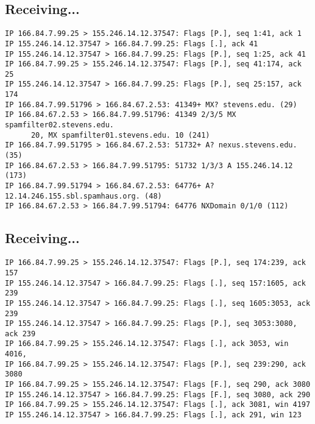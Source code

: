 \documentclass[xga]{xdvislides}
\begin{document}
\subsection{Receiving...}
\begin{verbatim}
IP 166.84.7.99.25 > 155.246.14.12.37547: Flags [P.], seq 1:41, ack 1
IP 155.246.14.12.37547 > 166.84.7.99.25: Flags [.], ack 41
IP 155.246.14.12.37547 > 166.84.7.99.25: Flags [P.], seq 1:25, ack 41
IP 166.84.7.99.25 > 155.246.14.12.37547: Flags [P.], seq 41:174, ack 25
IP 155.246.14.12.37547 > 166.84.7.99.25: Flags [P.], seq 25:157, ack 174
IP 166.84.7.99.51796 > 166.84.67.2.53: 41349+ MX? stevens.edu. (29)
IP 166.84.67.2.53 > 166.84.7.99.51796: 41349 2/3/5 MX spamfilter02.stevens.edu.
      20, MX spamfilter01.stevens.edu. 10 (241)
IP 166.84.7.99.51795 > 166.84.67.2.53: 51732+ A? nexus.stevens.edu. (35)
IP 166.84.67.2.53 > 166.84.7.99.51795: 51732 1/3/3 A 155.246.14.12 (173)
IP 166.84.7.99.51794 > 166.84.67.2.53: 64776+ A? 12.14.246.155.sbl.spamhaus.org. (48)
IP 166.84.67.2.53 > 166.84.7.99.51794: 64776 NXDomain 0/1/0 (112)
\end{verbatim}


\subsection{Receiving...}
\begin{verbatim}
IP 166.84.7.99.25 > 155.246.14.12.37547: Flags [P.], seq 174:239, ack 157
IP 155.246.14.12.37547 > 166.84.7.99.25: Flags [.], seq 157:1605, ack 239
IP 155.246.14.12.37547 > 166.84.7.99.25: Flags [.], seq 1605:3053, ack 239
IP 155.246.14.12.37547 > 166.84.7.99.25: Flags [P.], seq 3053:3080, ack 239
IP 166.84.7.99.25 > 155.246.14.12.37547: Flags [.], ack 3053, win 4016,
IP 166.84.7.99.25 > 155.246.14.12.37547: Flags [P.], seq 239:290, ack 3080
IP 166.84.7.99.25 > 155.246.14.12.37547: Flags [F.], seq 290, ack 3080
IP 155.246.14.12.37547 > 166.84.7.99.25: Flags [F.], seq 3080, ack 290
IP 166.84.7.99.25 > 155.246.14.12.37547: Flags [.], ack 3081, win 4197
IP 155.246.14.12.37547 > 166.84.7.99.25: Flags [.], ack 291, win 123
\end{verbatim}
\end{document}
